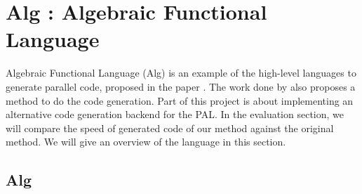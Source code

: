\chapter{Alg : Algebraic Functional Language} \label{chap:alg}
Algebraic Functional Language (Alg) is an example of the high-level languages to generate parallel code, proposed in the paper \cite{AlgebraicMultipartyProtocol}. The work done by \cite{AlgebraicMultipartyProtocol} also proposes a method to do the code generation. Part of this project is about implementing an alternative code generation backend for the PAL. In the evaluation section, we will compare the speed of generated code of our method against the original method. We will give an overview of the language in this section.  
\section{Alg}

